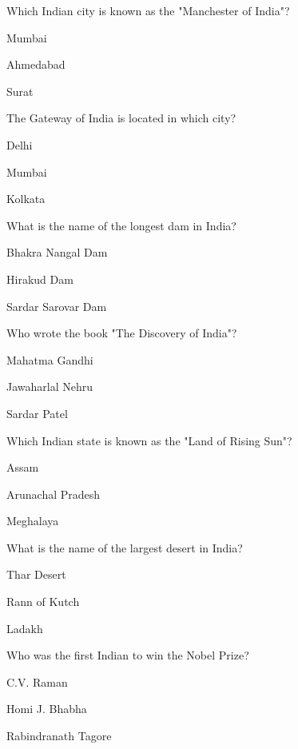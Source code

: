 \begin{enhancedmcq}{Which Indian city is known as the "Manchester of India"?}
\item Mumbai
\item Ahmedabad
\item Surat

\end{enhancedmcq}
\begin{enhancedmcq}{The Gateway of India is located in which city?}
\item Delhi
\item Mumbai
\item Kolkata

\end{enhancedmcq}
\begin{enhancedmcq}{What is the name of the longest dam in India?}
\item Bhakra Nangal Dam
\item Hirakud Dam
\item Sardar Sarovar Dam

\end{enhancedmcq}
\begin{enhancedmcq}{Who wrote the book "The Discovery of India"?}
\item Mahatma Gandhi
\item Jawaharlal Nehru
\item Sardar Patel

\end{enhancedmcq}
\begin{enhancedmcq}{Which Indian state is known as the "Land of Rising Sun"?}
\item Assam
\item Arunachal Pradesh
\item Meghalaya

\end{enhancedmcq}
\begin{enhancedmcq}{What is the name of the largest desert in India?}
\item Thar Desert
\item Rann of Kutch
\item Ladakh

\end{enhancedmcq}
\begin{enhancedmcq}{Who was the first Indian to win the Nobel Prize?}
\item C.V. Raman
\item Homi J. Bhabha
\item Rabindranath Tagore

\end{enhancedmcq}
